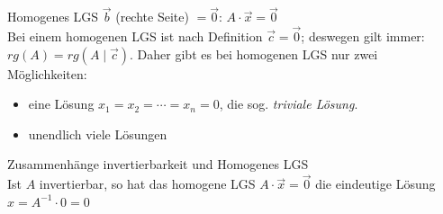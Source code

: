     \begin{definition}{Homogenes LGS}
        $\vec{b}$ (rechte Seite) $=\vec{0}$: $A\cdot\vec{x}=\vec{0}$\\
        Bei einem homogenen LGS ist nach Definition $\vec{c}=\vec{0}$; deswegen gilt immer: $rg(A)=rg(A\mid\vec{c})$.
            Daher gibt es bei homogenen LGS nur zwei Möglichkeiten:
            \begin{itemize}
                \item eine Lösung $x_1=x_2=\cdots=x_n=0$, die sog. \textit{triviale Lösung}.
                \item unendlich viele Lösungen
            \end{itemize}
    \end{definition}
    \begin{lemma}{Zusammenhänge invertierbarkeit und Homogenes LGS}\\
        Ist $A$ invertierbar, so hat das homogene LGS $A\cdot\vec{x}=\vec{0}$ die eindeutige Lösung $x=A^{-1}\cdot 0=0$
    \end{lemma}  

